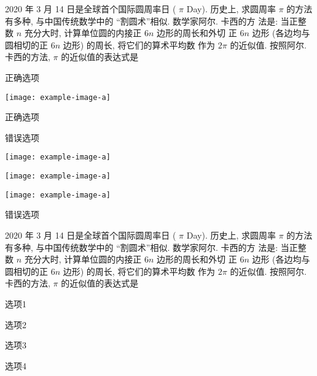 2020 年 3 月 14 日是全球首个国际圆周率日 ( $\pi$ Day). 历史上, 求圆周率 $\pi$ 的方法有多种, 与中国传统数学中的 “割圆术”相似. 数学家阿尔. 卡西的方 法是: 当正整数 $n$ 充分大时, 计算单位圆的内接正 $6 n$ 边形的周长和外切 正 $6 n$ 边形 (各边均与圆相切的正 $6 n$ 边形) 的周长, 将它们的算术平均数 作为 $2 \pi$ 的近似值. 按照阿尔. 卡西的方法, $\pi$ 的近似值的表达式是 \paren

\begin{xchoices}[]
  \item* 正确选项
  \item  \texttt{[image: example-image-a]}
  \item* 正确选项
  \item  错误选项
  \item  \texttt{[image: example-image-a]}
  \item  \texttt{[image: example-image-a]}
  \item  \texttt{[image: example-image-a]}
  \item  错误选项
\end{xchoices}
2020 年 3 月 14 日是全球首个国际圆周率日 ( $\pi$ Day). 历史上, 求圆周率 $\pi$ 的方法有多种, 与中国传统数学中的 “割圆术”相似. 数学家阿尔. 卡西的方 法是: 当正整数 $n$ 充分大时, 计算单位圆的内接正 $6 n$ 边形的周长和外切 正 $6 n$ 边形 (各边均与圆相切的正 $6 n$ 边形) 的周长, 将它们的算术平均数 作为 $2 \pi$ 的近似值. 按照阿尔. 卡西的方法, $\pi$ 的近似值的表达式是 \paren
\begin{xchoices}[items = 2, label-pos = left]
  \item 选项1
  \item 选项2
  \item 选项3
  \item 选项4
\end{xchoices}

